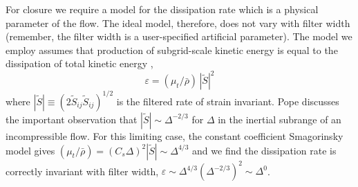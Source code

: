 For closure we require a model for the dissipation rate which is a physical parameter of the flow.  The ideal model, therefore, does not vary with filter width (remember, the filter width is a user-specified artificial parameter).  The model we employ assumes that production of subgrid-scale kinetic energy is equal to the dissipation of total kinetic energy \cite{Pope:2000},
\begin{equation}
\label{eqn_dissipation}
\varepsilon = (\mu_t/\bar{\rho}) \, |\tilde{S}|^2 %
\end{equation}
where $|\tilde{S}| \equiv (2 \tilde{S}_{ij} \tilde{S}_{ij})^{1/2}$ is the filtered rate of strain invariant.  Pope \cite{Pope:2000} discusses the important observation that $|\tilde{S}|\sim \Delta^{-2/3}$ for $\Delta$ in the inertial subrange of an incompressible flow.  For this limiting case, the constant coefficient Smagorinsky model gives $(\mu_t/\bar{\rho}) = (C_s \Delta)^2 |\tilde{S}| \sim \Delta^{4/3}$ and we find the dissipation rate is correctly invariant with filter width, $\varepsilon \sim \Delta^{4/3} (\Delta^{-2/3})^2 \sim \Delta^0$.

